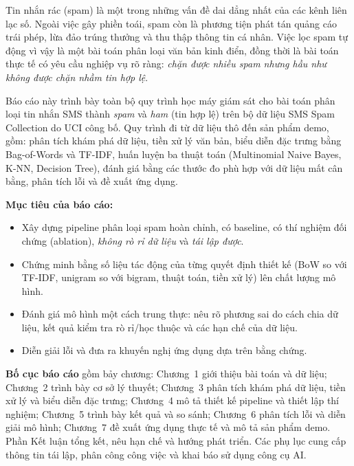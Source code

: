 
Tin nhắn rác (spam) là một trong những vấn đề dai dẳng nhất của các kênh liên lạc số. Ngoài việc gây phiền toái, spam còn là phương tiện phát tán quảng cáo trái phép, lừa đảo trúng thưởng và thu thập thông tin cá nhân. Việc lọc spam tự động vì vậy là một bài toán phân loại văn bản kinh điển, đồng thời là bài toán thực tế có yêu cầu nghiệp vụ rõ ràng: \textit{chặn được nhiều spam nhưng hầu như không được chặn nhầm tin hợp lệ}.

Báo cáo này trình bày toàn bộ quy trình học máy giám sát cho bài toán phân loại tin nhắn SMS thành \textit{spam} và \textit{ham} (tin hợp lệ) trên bộ dữ liệu SMS Spam Collection do UCI công bố. Quy trình đi từ dữ liệu thô đến sản phẩm demo, gồm: phân tích khám phá dữ liệu, tiền xử lý văn bản, biểu diễn đặc trưng bằng Bag-of-Words và TF-IDF, huấn luyện ba thuật toán (Multinomial Naive Bayes, K-NN, Decision Tree), đánh giá bằng các thước đo phù hợp với dữ liệu mất cân bằng, phân tích lỗi và đề xuất ứng dụng.

\textbf{Mục tiêu của báo cáo:}
\begin{itemize}
    \item Xây dựng pipeline phân loại spam hoàn chỉnh, có baseline, có thí nghiệm đối chứng (ablation), \textit{không rò rỉ dữ liệu} và \textit{tái lập được}.
    \item Chứng minh bằng số liệu tác động của từng quyết định thiết kế (BoW so với TF-IDF, unigram so với bigram, thuật toán, tiền xử lý) lên chất lượng mô hình.
    \item Đánh giá mô hình một cách trung thực: nêu rõ phương sai do cách chia dữ liệu, kết quả kiểm tra rò rỉ/học thuộc và các hạn chế của dữ liệu.
    \item Diễn giải lỗi và đưa ra khuyến nghị ứng dụng dựa trên bằng chứng.
\end{itemize}

\textbf{Bố cục báo cáo} gồm bảy chương: Chương~1 giới thiệu bài toán và dữ liệu; Chương~2 trình bày cơ sở lý thuyết; Chương~3 phân tích khám phá dữ liệu, tiền xử lý và biểu diễn đặc trưng; Chương~4 mô tả thiết kế pipeline và thiết lập thí nghiệm; Chương~5 trình bày kết quả và so sánh; Chương~6 phân tích lỗi và diễn giải mô hình; Chương~7 đề xuất ứng dụng thực tế và mô tả sản phẩm demo. Phần Kết luận tổng kết, nêu hạn chế và hướng phát triển. Các phụ lục cung cấp thông tin tái lập, phân công công việc và khai báo sử dụng công cụ AI.
